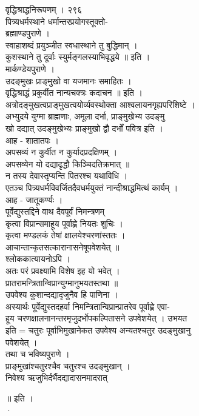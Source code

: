 \documentclass[11pt, openany]{book}
\begin{document}
{{{{{{{{{{ वृद्धिश्राद्धनिरूपणम् । २९६\\
पित्र्यधर्मस्थाने }{धर्मान्तरप्रयोगस्तूक्तो-}{\\
ब्रह्माण्डपुराणे ।\\
स्वाहाशब्दं प्रयुञ्जीत स्वधास्थाने तु बुद्धिमान् ।\\
कुशस्थाने तु दूर्वाः स्युर्मङ्गलस्याभिवृद्धये ॥ इति ।\\
मार्कण्डेयपुराणे ।\\
उदङ्मुखः प्राङ्मुखो वा यजमानः समाहितः ।\\
वृद्धिश्राद्धं प्रकुर्वीत नान्यचक्त्रः कदाचन ॥ इति ।\\
अत्रोदङ्मुखत्वप्राङ्मुखत्वयोर्व्यवस्थोक्ता आश्वलायनगृह्यपरिशिष्टे ।\\
अभ्युदये युग्मा ब्राह्मणाः, अमूला दर्भा, प्राङ्मुखेभ्य उदङ्मु\\
खो दद्यात् उदङ्मुखेभ्यः प्राङ्मुखो द्वौ दर्भों पवित्र इति ।\\
आह - शातातपः ।\\
अपसव्यं न कुर्वीत न कुर्यादप्रदक्षिणम् ।\\
अपसव्येन यो दद्यादृद्धौ किञ्चिदतिक्रमात् ॥\\
न तस्य देवास्तृप्यन्ति पितरश्च यथाविधि ।\\
एतञ्च पित्र्यधर्मविवर्जितदैवधर्मयुक्तं नान्दीश्राद्धमित्थं कार्यम्
।\\
आह - जातूकर्ण्यः ।\\
}{पूर्वेद्युस्तद्दिने}{ वाथ }{दैवपूर्वं}{ निमन्त्रणम् \textbar{}\\
कृत्वा विप्रान्समाहूय }{पूर्वाह्णे}{ नियतः शुचिः ।\\
कृत्वा मण्डलकं तेषां क्षालयेश्चरणांस्ततः ।\\
आचान्तान्कृतसत्कारानासनेषूपवेशयेत् ॥\\
श्लोककात्यायनोऽपि ।\\
अतः परं प्रवक्ष्यामि विशेष इह यो भवेत् ।\\
प्रातरामन्त्रितान्विप्रान्युग्मानुभयतस्तथा ॥\\
उपवेश्य कुशान्दद्यादृजुनैव हि पाणिना ।\\
अस्यार्थः पूर्वेद्युस्तदहर्वा निमन्त्रितान्विप्रान्प्रातरेव
}{पूर्वाह्णे}{ }{एवा-}{\\
हूय }{चरणक्षालनानन्तरमृजुदर्भोपकल्पितासने}{ उपवेशयेत् । उभयत\\
इति = चतुरः पूर्वाभिमुखानेकत उपवेश्य अन्यतश्चतुर उदङ्मुखानु\\
पवेशयेत् ।\\
तथा च भविष्यपुराणे ।\\
}{प्राङ्मुखांश्चतुरश्चैव}{ चतुरश्च उदङ्मुखान् ।\\
निवेश्य }{ऋजुभिर्दर्भैदद्यादासनमादरात्}{ ॥ इति ।\\
·

}}}}}}}}}}
\end{document}
